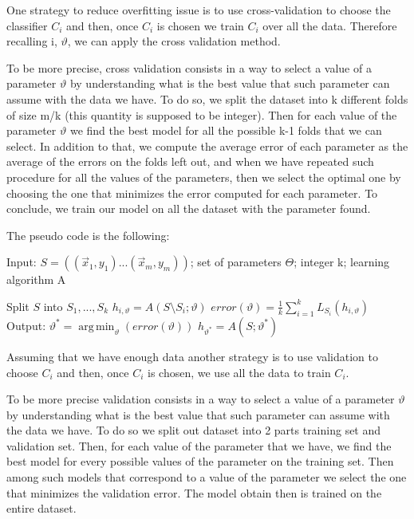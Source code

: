 \documentclass[a4paper,11pt,oneside]{book}
\DeclareMathOperator*{\argmin}{arg\,min}
\begin{document}
        \begin{solution}
            One strategy to reduce overfitting issue is to use cross-validation to choose the classifier $C_i$ and then, once $C_i$ is chosen we train $C_i$ over all the data. Therefore recalling i, $\vartheta$, we can apply the cross validation method.
            
            To be more precise, cross validation consists in a way to select a value of a parameter $\vartheta$ by understanding what is the best value that such parameter can assume with the data we have.
            To do so, we split the dataset into k different folds of size m/k (this quantity is supposed to be integer). Then for each value of the parameter $\vartheta$ we find the best model for all the possible k-1 folds that we can select. In addition to that, we compute the average error of each parameter as the average of the errors on the folds left out, and when we have repeated such procedure for all the values of the parameters, then we select the optimal one by choosing the one that minimizes the error computed for each parameter. To conclude, we train our model on all the dataset with the parameter found.
            
            \clearpage
            The pseudo code is the following:
            
            Input: $S = ((\vec{x}_1,y_1)...(\vec{x}_m,y_m))$; set of parameters $\Theta$; integer k; learning algorithm A

            \begin{algorithmic}[1]
            \State Split $S$ into $S_1,...,S_k$
            \ForAll{$\vartheta \in \Theta$}
                \State $h_{i,\vartheta} = A(S\setminus S_i; \vartheta)$
                \State $error(\vartheta) = \frac{1}{k}\sum_{i=1}^k L_{S_i}(h_{i,\vartheta})$
            \EndFor
            \EndFor
            \State Output: $\vartheta^* = \argmin_\vartheta(error(\vartheta))$
            \State \hspace{35pt} $h_{\vartheta^*} = A(S; \vartheta^*)$
            \end{algorithmic}

            Assuming that we have enough data another strategy is to use validation to choose $C_i$ and then, once $C_i$ is chosen, we use all the data to train $C_i$.

            To be more precise validation consists in a way to select a value of a parameter $\vartheta$ by understanding what is the best value that such parameter can assume with the data we have.
            To do so we split out dataset into 2 parts training set and validation set. Then, for each value of the parameter that we have, we find the best model for every possible values of the parameter on the training set. Then among such models that correspond to a value of the parameter we select the one that minimizes the validation error. The model obtain then is trained on the entire dataset.


\end{solution}
\end{document}
